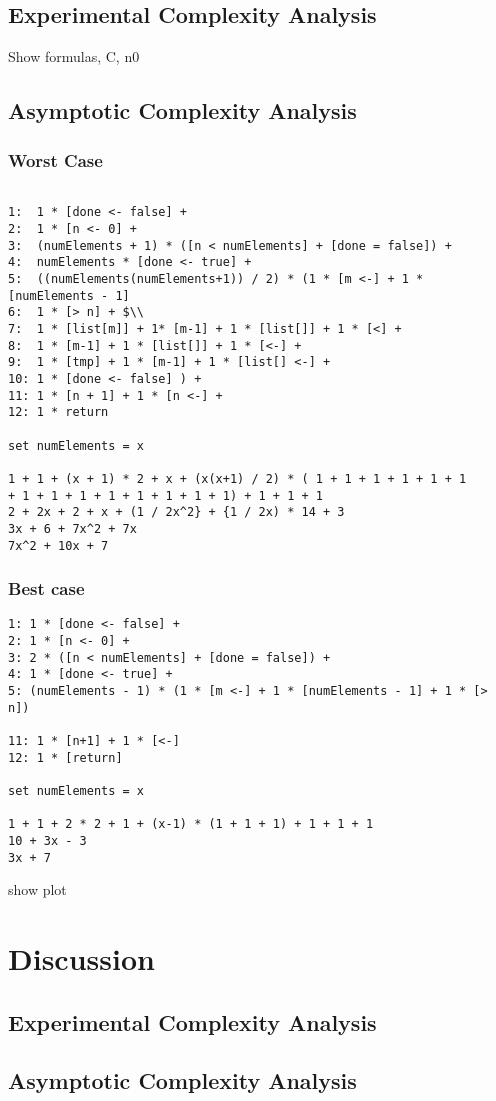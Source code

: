 \documentclass[a4paper,11pt,twoside]{article}
\begin{document}
\subsection{Experimental Complexity Analysis}
Show formulas, C, n0

\subsection{Asymptotic Complexity Analysis}
\subsubsection{Worst Case}
\begin{verbatim}

1:  1 * [done <- false] + 
2:  1 * [n <- 0] + 
3:  (numElements + 1) * ([n < numElements] + [done = false]) + 
4:  numElements * [done <- true] + 
5:  ((numElements(numElements+1)) / 2) * (1 * [m <-] + 1 * [numElements - 1]
6:  1 * [> n] + $\\
7:  1 * [list[m]] + 1* [m-1] + 1 * [list[]] + 1 * [<] + 
8:  1 * [m-1] + 1 * [list[]] + 1 * [<-] + 
9:  1 * [tmp] + 1 * [m-1] + 1 * [list[] <-] +
10: 1 * [done <- false] ) +
11: 1 * [n + 1] + 1 * [n <-] +
12: 1 * return

set numElements = x

1 + 1 + (x + 1) * 2 + x + (x(x+1) / 2) * ( 1 + 1 + 1 + 1 + 1 + 1
+ 1 + 1 + 1 + 1 + 1 + 1 + 1 + 1) + 1 + 1 + 1
2 + 2x + 2 + x + (1 / 2x^2} + {1 / 2x) * 14 + 3
3x + 6 + 7x^2 + 7x
7x^2 + 10x + 7
\end{verbatim}

\subsubsection{Best case}
\begin{verbatim}
1: 1 * [done <- false] +
2: 1 * [n <- 0] +
3: 2 * ([n < numElements] + [done = false]) +
4: 1 * [done <- true] +
5: (numElements - 1) * (1 * [m <-] + 1 * [numElements - 1] + 1 * [> n])

11: 1 * [n+1] + 1 * [<-]
12: 1 * [return]

set numElements = x

1 + 1 + 2 * 2 + 1 + (x-1) * (1 + 1 + 1) + 1 + 1 + 1
10 + 3x - 3
3x + 7
\end{verbatim}

show plot

\section{Discussion}
\subsection{Experimental Complexity Analysis}

\subsection{Asymptotic Complexity Analysis}



\end{document}
